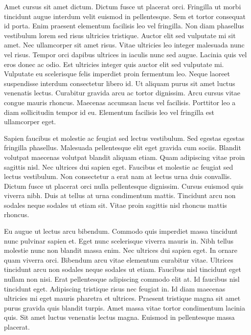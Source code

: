 \documentclass[11pt,a4paper]{article}
\begin{document}
Amet cursus sit amet dictum. Dictum fusce ut placerat orci. Fringilla ut morbi tincidunt augue interdum velit euismod in pellentesque. Sem et tortor consequat id porta. Enim praesent elementum facilisis leo vel fringilla. Non diam phasellus vestibulum lorem sed risus ultricies tristique. Auctor elit sed vulputate mi sit amet. Nec ullamcorper sit amet risus. Vitae ultricies leo integer malesuada nunc vel risus. Tempor orci dapibus ultrices in iaculis nunc sed augue. Lacinia quis vel eros donec ac odio. Est ultricies integer quis auctor elit sed vulputate mi. Vulputate eu scelerisque felis imperdiet proin fermentum leo. Neque laoreet suspendisse interdum consectetur libero id. Ut aliquam purus sit amet luctus venenatis lectus. Curabitur gravida arcu ac tortor dignissim. Arcu cursus vitae congue mauris rhoncus. Maecenas accumsan lacus vel facilisis. Porttitor leo a diam sollicitudin tempor id eu. Elementum facilisis leo vel fringilla est ullamcorper eget.

Sapien faucibus et molestie ac feugiat sed lectus vestibulum. Sed egestas egestas fringilla phasellus. Malesuada pellentesque elit eget gravida cum sociis. Blandit volutpat maecenas volutpat blandit aliquam etiam. Quam adipiscing vitae proin sagittis nisl. Nec ultrices dui sapien eget. Faucibus et molestie ac feugiat sed lectus vestibulum. Non consectetur a erat nam at lectus urna duis convallis. Dictum fusce ut placerat orci nulla pellentesque dignissim. Cursus euismod quis viverra nibh. Duis at tellus at urna condimentum mattis. Tincidunt arcu non sodales neque sodales ut etiam sit. Vitae proin sagittis nisl rhoncus mattis rhoncus.

Eu augue ut lectus arcu bibendum. Commodo quis imperdiet massa tincidunt nunc pulvinar sapien et. Eget nunc scelerisque viverra mauris in. Nibh tellus molestie nunc non blandit massa enim. Nec ultrices dui sapien eget. In ornare quam viverra orci. Bibendum arcu vitae elementum curabitur vitae. Ultrices tincidunt arcu non sodales neque sodales ut etiam. Faucibus nisl tincidunt eget nullam non nisi. Erat pellentesque adipiscing commodo elit at. Id faucibus nisl tincidunt eget. Adipiscing tristique risus nec feugiat in. Id diam maecenas ultricies mi eget mauris pharetra et ultrices. Praesent tristique magna sit amet purus gravida quis blandit turpis. Amet massa vitae tortor condimentum lacinia quis. Sit amet luctus venenatis lectus magna. Euismod in pellentesque massa placerat.
\end{document}
